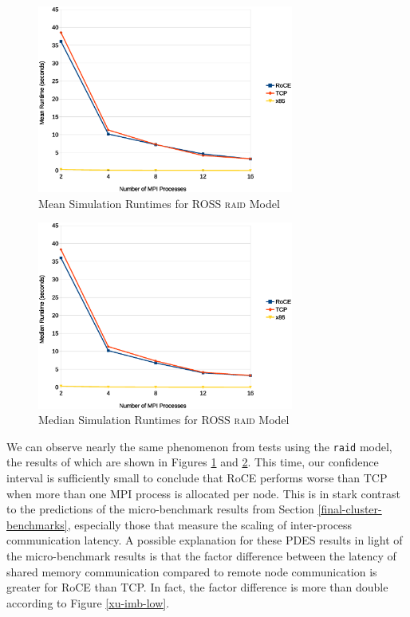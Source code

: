 \documentclass[11pt]{book}
\begin{document}
\begin{figure}
\centering
\includegraphics[width=0.75\textwidth]{raid}
\caption{Mean Simulation Runtimes for ROSS \textsc{raid} Model}
\label{raid}
\end{figure}

\begin{figure}
\centering
\includegraphics[width=0.75\textwidth]{raid_median}
\caption{Median Simulation Runtimes for ROSS \textsc{raid} Model}
\label{raid-median}
\end{figure}

We can observe nearly the same phenomenon from tests using the \verb;raid;
model, the results of which are shown in Figures \ref{raid} and
\ref{raid-median}. This time, our confidence interval is sufficiently
small to conclude that RoCE performs worse than TCP when more than one MPI
process is allocated per node. This is in stark contrast to the predictions of
the micro-benchmark results from Section
  \ref{final-cluster-benchmarks}, especially those that measure the scaling of
inter-process communication latency. A possible explanation for these PDES
results in light of the micro-benchmark results is that the factor difference
between the latency of shared memory communication compared to remote node
communication is greater for RoCE than TCP. In fact, the factor difference is
more than double according to Figure \ref{xu-imb-low}.
\end{document}
